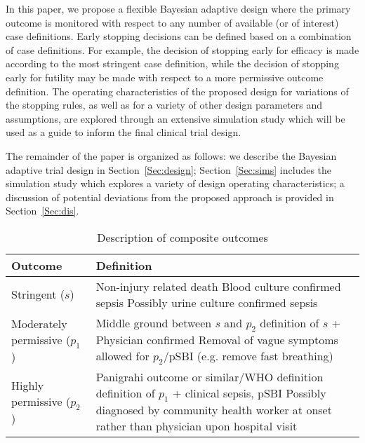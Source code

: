 \documentclass[12pt]{article}
\begin{document}
In this paper, we propose a flexible Bayesian adaptive design where the primary outcome is monitored with respect to any number of available (or of interest) case definitions. Early stopping decisions can be defined based on a combination of case definitions. For example, the decision of stopping early for efficacy is made according to the most stringent case definition, while the decision of stopping early for futility may be made with respect to a more permissive outcome definition. The operating characteristics of the proposed design for variations of the stopping rules, as well as for a variety of other design parameters and assumptions, are explored through an extensive simulation study which will be used as a guide to inform the final clinical trial design.

The remainder of the paper is organized as follows: we describe the Bayesian adaptive trial design in Section~\ref{Sec:design}; Section~\ref{Sec:sims} includes the simulation study which explores a variety of design operating characteristics; a discussion of potential deviations from the proposed approach is provided in Section~\ref{Sec:dis}.

\begin{table}
\begin{tabular} {|l | p{10.5cm}|}
	\hline
	Outcome & Definition\\
	\hline
Stringent ($s$) &	Non-injury related death
\newline
                        Blood culture confirmed sepsis
\newline
                        Possibly urine culture confirmed sepsis
\\
    \hline
Moderately permissive ($p_1$)	& Middle ground between $s$ and $p_2$
\newline
                                                     definition of $s$ + Physician confirmed
\newline
                                                     Removal of vague symptoms allowed for $p_2$/pSBI
\newline
                                                     (e.g. remove fast breathing)
\\
      \hline
Highly permissive ($p_2$)	& Panigrahi outcome or similar/WHO definition
\newline                                     
                                                definition of $p_1$ +  clinical sepsis, pSBI
\newline
                                               Possibly diagnosed by community health worker at onset rather than physician upon hospital visit
\\
        \hline
\end{tabular}

   \caption{ Description of composite outcomes}
\label{t1}  
\end{table}
\end{document}

